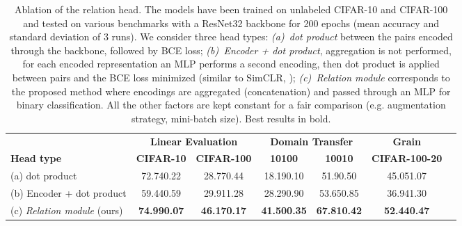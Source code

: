 \documentclass{article}
\begin{document}
\begin{table}[H]
 \caption{Ablation of the relation head. The models have been trained on unlabeled CIFAR-10 and CIFAR-100 and tested on various benchmarks with a ResNet32 backbone for 200 epochs (mean accuracy and standard deviation of 3 runs). We consider three head types: \emph{(a)~dot product} between the pairs encoded through the backbone, followed by BCE loss; \emph{(b)~Encoder + dot product}, aggregation is not performed, for each encoded representation an MLP performs a second encoding, then dot product is applied between pairs and the BCE loss minimized (similar to SimCLR, \citealt{chen2020simple}); \emph{(c)~Relation module} corresponds to the proposed method where encodings are aggregated (concatenation) and passed through an MLP for binary classification. All the other factors are kept constant for a fair comparison (e.g. augmentation strategy, mini-batch size). Best results in bold.}
 \label{tab:head_type}
 \begin{adjustbox}{width=0.75\columnwidth,center}
  \centering
  \begin{tabular}{lcccccc}
    \toprule
     & \multicolumn{2}{c}{\textbf{Linear Evaluation}} & \multicolumn{2}{c}{\textbf{Domain Transfer}} &
     \multicolumn{1}{c}{\textbf{Grain}}\\
    \cmidrule[0.1pt](r){2-3} \cmidrule[0.1pt](r){4-5} \cmidrule[0.1pt](l){6-6}
    \textbf{Head type} &
    \textbf{CIFAR-10} & \textbf{CIFAR-100} & \textbf{10}\textbf{100} & \textbf{100}\textbf{10} & \textbf{CIFAR-100-20}\\
    \midrule
    (a) dot product & 
    72.74\small{0.22} & 28.77\small{0.44} & 18.19\small{0.10} & 51.9\small{0.50} & 45.05\small{1.07}\\
    (b) Encoder + dot product & 
    59.44\small{0.59} & 29.91\small{1.28} & 28.29\small{0.90} & 53.65\small{0.85} & 36.94\small{1.30}\\
    (c) \emph{Relation module} (ours) & 
    \textbf{74.99\small{0.07}} & \textbf{46.17\small{0.17}} & \textbf{41.50\small{0.35}} & \textbf{67.81\small{0.42}} & \textbf{52.44\small{0.47}}\\
    \bottomrule
  \end{tabular}
 \end{adjustbox}
\end{table}
\end{document}
